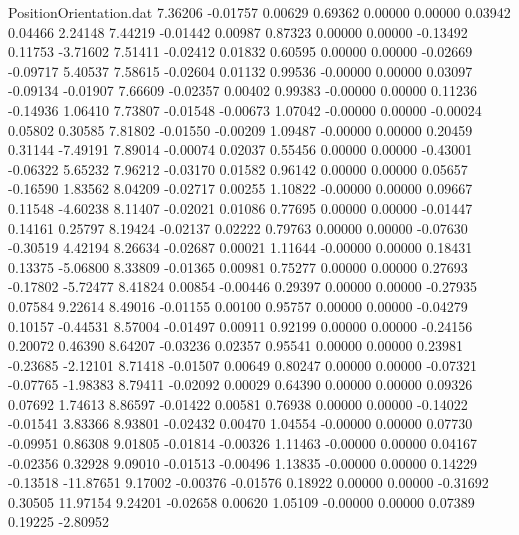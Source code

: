 \begin{filecontents}{PositionOrientation.dat}
   7.36206   -0.01757    0.00629     0.69362    0.00000    0.00000    0.03942    0.04466    2.24148
   7.44219   -0.01442    0.00987     0.87323    0.00000    0.00000   -0.13492    0.11753   -3.71602
   7.51411   -0.02412    0.01832     0.60595    0.00000    0.00000   -0.02669   -0.09717    5.40537
   7.58615   -0.02604    0.01132     0.99536   -0.00000    0.00000    0.03097   -0.09134   -0.01907
   7.66609   -0.02357    0.00402     0.99383   -0.00000    0.00000    0.11236   -0.14936    1.06410
   7.73807   -0.01548   -0.00673     1.07042   -0.00000    0.00000   -0.00024    0.05802    0.30585
   7.81802   -0.01550   -0.00209     1.09487   -0.00000    0.00000    0.20459    0.31144   -7.49191
   7.89014   -0.00074    0.02037     0.55456    0.00000    0.00000   -0.43001   -0.06322    5.65232
   7.96212   -0.03170    0.01582     0.96142    0.00000    0.00000    0.05657   -0.16590    1.83562
   8.04209   -0.02717    0.00255     1.10822   -0.00000    0.00000    0.09667    0.11548   -4.60238
   8.11407   -0.02021    0.01086     0.77695    0.00000    0.00000   -0.01447    0.14161    0.25797
   8.19424   -0.02137    0.02222     0.79763    0.00000    0.00000   -0.07630   -0.30519    4.42194
   8.26634   -0.02687    0.00021     1.11644   -0.00000    0.00000    0.18431    0.13375   -5.06800
   8.33809   -0.01365    0.00981     0.75277    0.00000    0.00000    0.27693   -0.17802   -5.72477
   8.41824    0.00854   -0.00446     0.29397    0.00000    0.00000   -0.27935    0.07584    9.22614
   8.49016   -0.01155    0.00100     0.95757    0.00000    0.00000   -0.04279    0.10157   -0.44531
   8.57004   -0.01497    0.00911     0.92199    0.00000    0.00000   -0.24156    0.20072    0.46390
   8.64207   -0.03236    0.02357     0.95541    0.00000    0.00000    0.23981   -0.23685   -2.12101
   8.71418   -0.01507    0.00649     0.80247    0.00000    0.00000   -0.07321   -0.07765   -1.98383
   8.79411   -0.02092    0.00029     0.64390    0.00000    0.00000    0.09326    0.07692    1.74613
   8.86597   -0.01422    0.00581     0.76938    0.00000    0.00000   -0.14022   -0.01541    3.83366
   8.93801   -0.02432    0.00470     1.04554   -0.00000    0.00000    0.07730   -0.09951    0.86308
   9.01805   -0.01814   -0.00326     1.11463   -0.00000    0.00000    0.04167   -0.02356    0.32928
   9.09010   -0.01513   -0.00496     1.13835   -0.00000    0.00000    0.14229   -0.13518  -11.87651
   9.17002   -0.00376   -0.01576     0.18922    0.00000    0.00000   -0.31692    0.30505   11.97154
   9.24201   -0.02658    0.00620     1.05109   -0.00000    0.00000    0.07389    0.19225   -2.80952

\end{filecontents}
